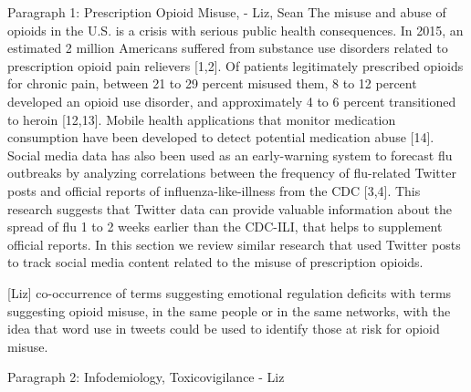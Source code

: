 \documentclass[sigconf]{acmart}
\begin{document}
Paragraph 1: Prescription Opioid Misuse, - Liz, Sean
The misuse and abuse of opioids in the U.S. is a crisis with serious public health consequences. In 2015, an estimated 2 million Americans suffered from substance use disorders related to prescription opioid pain relievers [1,2]. Of patients legitimately prescribed opioids for chronic pain, between 21 to 29 percent misused them, 8 to 12 percent developed an opioid use disorder, and approximately 4 to 6 percent transitioned to heroin [12,13]. Mobile health applications that monitor medication consumption have been developed to detect potential medication abuse [14]. Social media data has also been used as an early-warning system to forecast flu outbreaks by analyzing correlations between the frequency of flu-related Twitter posts and official reports of influenza-like-illness from the CDC [3,4]. This research suggests that Twitter data can provide valuable information about the spread of flu 1 to 2 weeks earlier than the CDC-ILI, that helps to supplement official reports. In this section we review similar research that used Twitter posts to track social media content related to the misuse of prescription opioids. 

[Liz] co-occurrence of terms suggesting emotional regulation deficits with terms suggesting opioid misuse, in the same people or in the same networks, with the idea that word use in tweets could be used to identify those at risk for opioid misuse.



Paragraph 2: Infodemiology, Toxicovigilance - Liz


\end{document}
